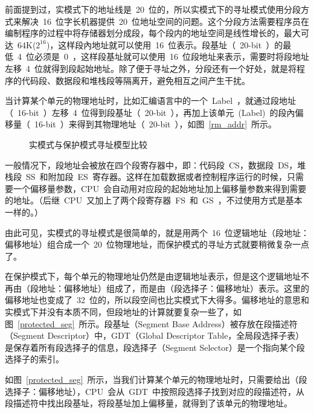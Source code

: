 前面提到过，实模式下的地址线是~20~位的，所以实模式下的寻址模式使用分段方式来解决~16~位字长机器提供~20~位地址空间的问题。这个分段方法需要程序员在编制程序的过程中将存储器划分成段，每个段内的地址空间是线性增长的，最大可达~64K($2^16$)，这样段內地址就可以使用~16~位表示。段基址（~20-bit~）的最低~4~位必须是~0~，这样段基址就可以使用~16~位段地址来表示，需要时将段地址左移~4~位就得到段起始地址。除了便于寻址之外，分段还有一个好处，就是将程序的代码段、数据段和堆栈段等隔离开，避免相互之间产生干扰。

当计算某个单元的物理地址时，比如汇编语言中的一个~Label~，就通过段地址（~16-bit~）左移~4~位得到段基址（~20-bit~），再加上该单元~(Label)~的段內偏移量（~16-bit~）来得到其物理地址（~20-bit~），如图~\ref{rm_addr}~所示。

\begin{figure*}[!t]
\centerline{
\hfil
{}}
\caption{实模式与保护模式寻址模型比较}
\label{real_vs_pro}
\end{figure*}

一般情况下，段地址会被放在四个段寄存器中，即：代码段~CS，数据段~DS，堆栈段~SS~和附加段~ES~寄存器。这样在加载数据或者控制程序运行的时候，只需要一个偏移量参数，CPU~会自动用对应段的起始地址加上偏移量参数来得到需要的地址。（后继~CPU~又加上了两个段寄存器~FS~和~GS~，不过使用方式是基本一样的。）

由此可见，实模式的寻址模式是很简单的，就是用两个~16~位逻辑地址（段地址：偏移地址）组合成一个~20~位物理地址，而保护模式的寻址方式就要稍微复杂一点了。


在保护模式下，每个单元的物理地址仍然是由逻辑地址表示，但是这个逻辑地址不再由（段地址：偏移地址）组成了，而是由（段选择子：偏移地址）表示。这里的偏移地址也变成了~32~位的，所以段空间也比实模式下大得多。偏移地址的意思和实模式下并没有本质不同，但段地址的计算就要复杂一些了，如图~\ref{protected_seg}~所示。段基址（Segment Base Address）被存放在段描述符（Segment Descriptor）中，GDT（Global Descriptor Table，全局段选择子表）是保存着所有段选择子的信息，段选择子（Segment Selector）是一个指向某个段选择子的索引。

如图~\ref{protected_seg}~所示，当我们计算某个单元的物理地址时，只需要给出（段选择子：偏移地址），CPU~会从~GDT~中按照段选择子找到对应的段描述符，从段描述符中找出段基址，将段基址加上偏移量，就得到了该单元的物理地址。


